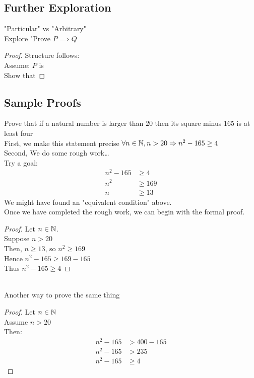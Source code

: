 \documentclass[12pt, letterpaper, twoside]{article}
\begin{document}
\subsection{Further Exploration}
"Particular" vs "Arbitrary"\\
Explore "Prove $P \implies Q$\\
\begin{proof}
	Structure follows:\\
	Assume: $P$ is \True\\
	Show that 
\end{proof}
\subsection{Sample Proofs}
Prove that if a natural number is larger than $20$ then its square minus $165$ is at least four\\
\hspace*{10mm} First, we make this statement precise $\forall n \in \mathbb N, n > 20 \mathrel{\Rightarrow} n^2 - 165 \ge 4$\\
\hspace*{10mm} Second, We do some rough work\dots\\
Try a goal:
\begin{align*}
	n^2 - 165 &\ge 4\\
	n^2 &\ge 169\\
	n &\ge 13
\end{align*}
We might have found an "equivalent condition" above.\\
Once we have completed the rough work, we can begin with the formal proof.\\
\begin{proof}
	Let $n \in \mathbb N$.\\
	Suppose $n > 20$\\
	Then, $n \ge 13$, so $n^2 \ge 169$\\
	Hence $n^2 - 165 \ge169-165$\\
	Thus $n^2 - 165 \ge 4$
\end{proof}
\\
Another way to prove the same thing\\
\begin{proof}
	Let $n \in \mathbb N$\\
	Assume $n > 20$\\
	Then: 
	\begin{align*}
		n^2 - 165 &> 400 - 165\\
		n^2 - 165 &> 235\\
		n^2 - 165 &\ge 4
	\end{align*}
\end{proof}
\end{document}
